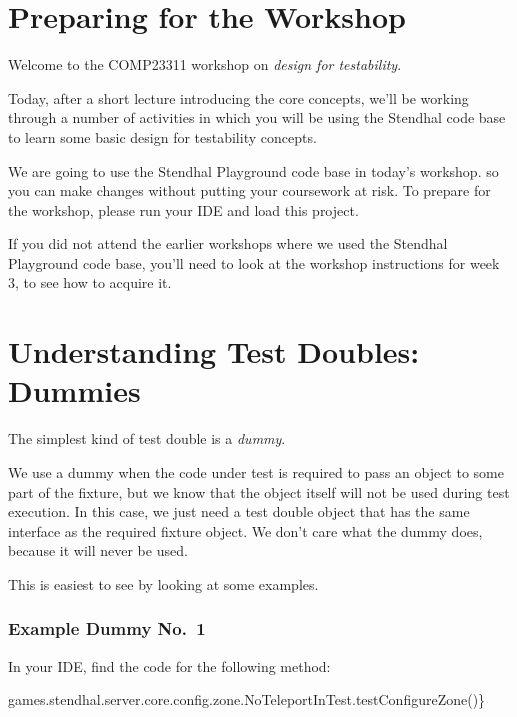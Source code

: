 \documentclass[
]{book}
\newenvironment{Shaded}{\begin{snugshade}}{\end{snugshade}}
\newcommand{\FunctionTok}[1]{\textcolor[rgb]{0.00,0.00,0.00}{#1}}
\newcommand{\NormalTok}[1]{#1}
\begin{document}
\hypertarget{preparing-for-the-workshop-1}{%
\section{Preparing for the Workshop}\label{preparing-for-the-workshop-1}}

Welcome to the COMP23311 workshop on \emph{design for testability}.

Today, after a short lecture introducing the core concepts, we'll be working through a number of activities in which you will be using the Stendhal code base to learn some basic design for testability concepts.

We are going to use the Stendhal Playground code base in today's workshop. so you can make changes without putting your coursework at risk. To prepare for the workshop, please run your IDE and load this project.

If you did not attend the earlier workshops where we used the Stendhal Playground code base, you'll need to look at the workshop instructions for week 3, to see how to acquire it.

\hypertarget{dummies}{%
\section{Understanding Test Doubles: Dummies}\label{dummies}}

The simplest kind of test double is a \emph{dummy}.

We use a dummy when the code under test is required to pass an object to some part of the fixture, but we know that the object itself will not be used during test execution. In this case, we just need a test double object that has the same interface as the required fixture object. We don't care what the dummy does, because it will never be used.

This is easiest to see by looking at some examples.

\hypertarget{dummy1}{%
\subsubsection{Example Dummy No.~1}\label{dummy1}}

In your IDE, find the code for the following method:

\begin{Shaded}
\begin{Highlighting}[]
\NormalTok{games.}\FunctionTok{stendhal}\NormalTok{.}\FunctionTok{server}\NormalTok{.}\FunctionTok{core}\NormalTok{.}\FunctionTok{config}\NormalTok{.}\FunctionTok{zone}\NormalTok{.}\FunctionTok{NoTeleportInTest}\NormalTok{.}\FunctionTok{testConfigureZone}\NormalTok{()\}}
\end{Highlighting}
\end{Shaded}
\end{document}
